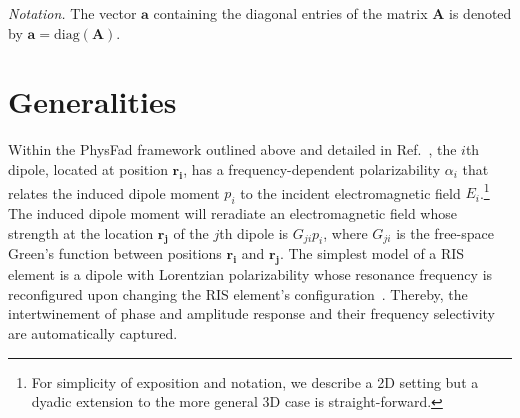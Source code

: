 \documentclass[journal,12pt,onecolumn,draftclsnofoot]{IEEEtran}
\begin{document}
\textit{Notation.} The vector $\mathbf{a}$ containing the diagonal entries of the matrix $\mathbf{A}$ is denoted by $\mathbf{a} = \mathrm{diag}(\mathbf{A})$.




\section{Generalities}\label{sec_Generalities}

Within the PhysFad framework outlined above and detailed in Ref.~\cite{PhysFad}, the $i$th dipole, located at position $\mathbf{r_i}$, has a frequency-dependent polarizability $\alpha_i$ that relates the induced dipole moment $p_i$ to the incident electromagnetic field $E_i$.\footnote{For simplicity of exposition and notation, we describe a 2D setting but a dyadic extension to the more general 3D case is straight-forward.} The induced dipole moment will reradiate an electromagnetic field whose strength at the location $\mathbf{r_j}$ of the $j$th dipole is $G_{ji}p_i$, where $G_{ji}$ is the free-space Green's function between positions $\mathbf{r_i}$ and $\mathbf{r_j}$. The simplest model of a RIS element is a dipole with Lorentzian polarizability whose resonance frequency is reconfigured upon changing the RIS element's configuration~\cite{PhysFad}. Thereby, the intertwinement of phase and amplitude response and their frequency selectivity are automatically captured. 
\end{document}
